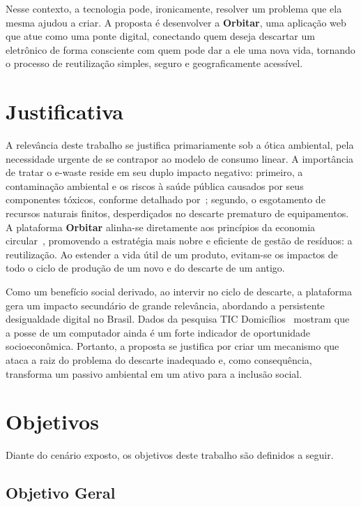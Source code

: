 \documentclass[
	12pt,				%
	openright,			%
	oneside,			%
	a4paper,			%
	english,			%
	brazil				%
	]{abntex2}
\theoremstyle{definition}
\begin{document}
Nesse contexto, a tecnologia pode, ironicamente, resolver um problema que ela mesma ajudou a criar. A proposta é desenvolver a \textbf{Orbitar}, uma aplicação web que atue como uma ponte digital, conectando quem deseja descartar um eletrônico de forma consciente com quem pode dar a ele uma nova vida, tornando o processo de reutilização simples, seguro e geograficamente acessível.

\section[Justificativa]{Justificativa}

A relevância deste trabalho se justifica primariamente sob a ótica ambiental, pela necessidade urgente de se contrapor ao modelo de consumo linear. A importância de tratar o e-waste reside em seu duplo impacto negativo: primeiro, a contaminação ambiental e os riscos à saúde pública causados por seus componentes tóxicos, conforme detalhado por~\cite{perkins2014}; segundo, o esgotamento de recursos naturais finitos, desperdiçados no descarte prematuro de equipamentos. A plataforma \textbf{Orbitar} alinha-se diretamente aos princípios da economia circular~\cite{ellen2023}, promovendo a estratégia mais nobre e eficiente de gestão de resíduos: a reutilização. Ao estender a vida útil de um produto, evitam-se os impactos de todo o ciclo de produção de um novo e do descarte de um antigo.

Como um benefício social derivado, ao intervir no ciclo de descarte, a plataforma gera um impacto secundário de grande relevância, abordando a persistente desigualdade digital no Brasil. Dados da pesquisa TIC Domicílios~\cite{cgi2024} mostram que a posse de um computador ainda é um forte indicador de oportunidade socioeconômica. Portanto, a proposta se justifica por criar um mecanismo que ataca a raiz do problema do descarte inadequado e, como consequência, transforma um passivo ambiental em um ativo para a inclusão social.

\section[Objetivos]{Objetivos}

Diante do cenário exposto, os objetivos deste trabalho são definidos a seguir.

\subsection[Objetivo Geral]{Objetivo Geral}
\end{document}
